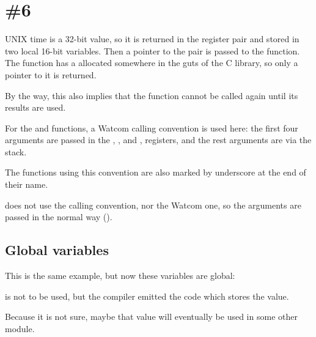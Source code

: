 \section{\Example{} \#6}






UNIX time is a 32-bit value, so it is returned in the  register pair and stored in two local 16-bit variables.
Then a pointer to the pair is passed to the
 function.
The  function has a  
allocated somewhere in the guts of the C library, so only a pointer to it is returned. 

By the way, this also implies that the function cannot be called again until its results are used.

For the  and  
functions, a Watcom calling convention is used here:
the first four arguments are passed in the , ,  and , 
registers, and the rest arguments are via the stack.

The functions using this convention are also marked by underscore at the end of their name.

does not use the  calling convention, nor the Watcom one,
so the arguments are passed in the normal  way ().

\subsection{Global variables}

This is the same example, but now these variables are global:





 is not to be used, but the compiler emitted the code which stores the value.

Because it is not sure, maybe that value will eventually be used in some other module.
